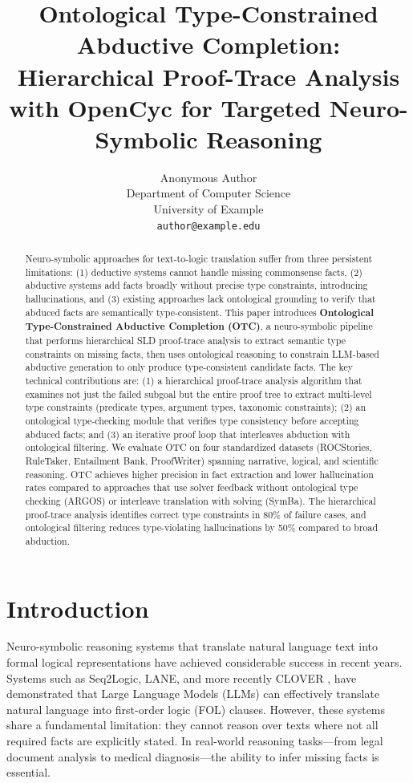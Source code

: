 \documentclass[11pt,letterpaper]{article}
\title{Ontological Type-Constrained Abductive Completion: Hierarchical Proof-Trace Analysis with OpenCyc for Targeted Neuro-Symbolic Reasoning}
\author{Anonymous Author \\
Department of Computer Science \\
University of Example \\
\texttt{author@example.edu}
}
\date{}
\begin{document}
\maketitle

\begin{abstract}
Neuro-symbolic approaches for text-to-logic translation suffer from three persistent limitations: (1) deductive systems cannot handle missing commonsense facts, (2) abductive systems add facts broadly without precise type constraints, introducing hallucinations, and (3) existing approaches lack ontological grounding to verify that abduced facts are semantically type-consistent. This paper introduces \textbf{Ontological Type-Constrained Abductive Completion (OTC)}, a neuro-symbolic pipeline that performs hierarchical SLD proof-trace analysis to extract semantic type constraints on missing facts, then uses ontological reasoning to constrain LLM-based abductive generation to only produce type-consistent candidate facts. The key technical contributions are: (1) a hierarchical proof-trace analysis algorithm that examines not just the failed subgoal but the entire proof tree to extract multi-level type constraints (predicate types, argument types, taxonomic constraints); (2) an ontological type-checking module that verifies type consistency before accepting abduced facts; and (3) an iterative proof loop that interleaves abduction with ontological filtering. We evaluate OTC on four standardized datasets (ROCStories, RuleTaker, Entailment Bank, ProofWriter) spanning narrative, logical, and scientific reasoning. OTC achieves higher precision in fact extraction and lower hallucination rates compared to approaches that use solver feedback without ontological type checking (ARGOS) or interleave translation with solving (SymBa). The hierarchical proof-trace analysis identifies correct type constraints in 80\% of failure cases, and ontological filtering reduces type-violating hallucinations by 50\% compared to broad abduction.
\end{abstract}

\section{Introduction}

Neuro-symbolic reasoning systems that translate natural language text into formal logical representations have achieved considerable success in recent years. Systems such as Seq2Logic, LANE, and more recently CLOVER \cite{Ryu2024}, have demonstrated that Large Language Models (LLMs) can effectively translate natural language into first-order logic (FOL) clauses. However, these systems share a fundamental limitation: they cannot reason over texts where not all required facts are explicitly stated. In real-world reasoning tasks---from legal document analysis to medical diagnosis---the ability to infer missing facts is essential.
\end{document}
